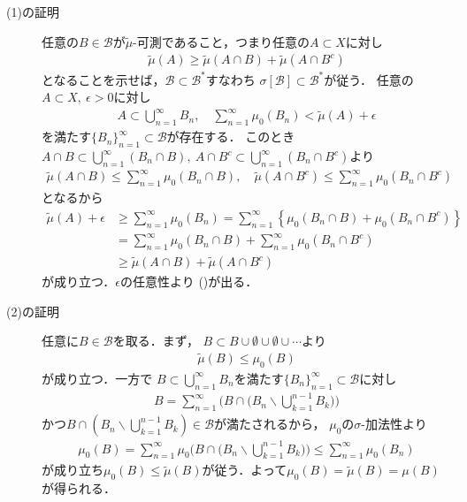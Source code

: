 		\begin{prf}\mbox{}
			\begin{description}
				\item[(1)の証明]
					任意の$B \in \mathcal{B}$が$\tilde{\mu}$-可測であること，つまり任意の$A \subset X$に対し
					\begin{align}
						\tilde{\mu}(A) \geq \tilde{\mu}(A \cap B) + \tilde{\mu}(A \cap B^c)
						\label{eq:appendix_finite_additive_measure_expansion_2}
					\end{align}
					となることを示せば，$\mathcal{B} \subset \mathcal{B}^*$すなわち
					$\sigma[\mathcal{B}] \subset \mathcal{B}^*$が従う．
					任意の$A \subset X,\ \epsilon > 0$に対し
					\begin{align}
						A \subset \bigcup_{n=1}^\infty B_n,
						\quad \sum_{n=1}^\infty \mu_0(B_n) < \tilde{\mu}(A) + \epsilon
					\end{align}
					を満たす$\{B_n\}_{n=1}^\infty \subset \mathcal{B}$が存在する．
					このとき$A \cap B \subset \bigcup_{n=1}^\infty (B_n \cap B)
					,\ A \cap B^c \subset \bigcup_{n=1}^\infty (B_n \cap B^c)$より
					\begin{align}
						\tilde{\mu}(A \cap B) \leq \sum_{n=1}^\infty \mu_0(B_n \cap B),
						\quad \tilde{\mu}(A \cap B^c) \leq \sum_{n=1}^\infty \mu_0(B_n \cap B^c)
					\end{align}
					となるから
					\begin{align}
						\tilde{\mu}(A) + \epsilon
						&\geq \sum_{n=1}^\infty \mu_0(B_n)
						= \sum_{n=1}^\infty \left\{ \mu_0(B_n \cap B) + \mu_0(B_n \cap B^c) \right\} \\
						&= \sum_{n=1}^\infty \mu_0(B_n \cap B) + \sum_{n=1}^\infty \mu_0(B_n \cap B^c) \\
						&\geq \tilde{\mu}(A \cap B) + \tilde{\mu}(A \cap B^c)
					\end{align}
					が成り立つ．$\epsilon$の任意性より
					()が出る．
				
				\item[(2)の証明]
					任意に$B \in \mathcal{B}$を取る．まず，
					$B \subset B \cup \emptyset \cup \emptyset \cup \cdots$より
					\begin{align}
						\tilde{\mu}(B) \leq \mu_0(B)
					\end{align}
					が成り立つ．一方で
					$B \subset \bigcup_{n=1}^\infty B_n$を満たす$\{B_n\}_{n=1}^\infty \subset \mathcal{B}$に対し
					\begin{align}
						B = \sum_{n=1}^\infty \Biggl( B \cap \Biggl( B_n \backslash \bigcup_{k=1}^{n-1}B_k \Biggr) \Biggr)
					\end{align}
					かつ$B \cap \left( B_n \backslash \bigcup_{k=1}^{n-1}B_k \right) \in \mathcal{B}$が満たされるから，
					$\mu_0$の$\sigma$-加法性より
					\begin{align}
						\mu_0(B) = \sum_{n=1}^\infty \mu_0\Biggl( B \cap \Biggl( B_n \backslash \bigcup_{k=1}^{n-1}B_k \Biggr) \Biggr)
						\leq \sum_{n=1}^\infty \mu_0(B_n)
					\end{align}
					が成り立ち$\mu_0(B) \leq \tilde{\mu}(B)$が従う．よって$\mu_0(B) = \tilde{\mu}(B) = \mu(B)$が得られる．
				

\end{description}
\end{prf}
